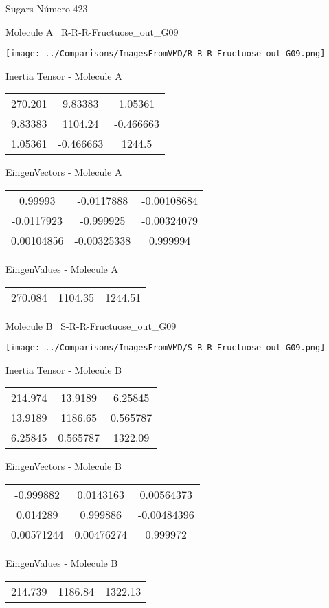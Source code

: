\vtab[-3cm]
\begin{center}
{\large Sugars \tab Número 423}
\end{center}
\begin{multicols}{2}
\begin{center}

Molecule A \
R-R-R-Fructuose\_out\_G09

\texttt{[image: ../Comparisons/ImagesFromVMD/R-R-R-Fructuose\_out\_G09.png]}

Inertia Tensor - Molecule A \\
\begin{tabular}{|c c c|}
270.201	 & 	9.83383	 & 	1.05361	 \\
9.83383	 & 	1104.24	 & 	-0.466663	 \\
1.05361	 & 	-0.466663	 & 	1244.5
\end{tabular}

\vtab
 EingenVectors - Molecule A     \\
\begin{tabular}{|c c c|}
0.99993	 & 	-0.0117888	 & 	-0.00108684	 \\
-0.0117923	 & 	-0.999925	 & 	-0.00324079	 \\
0.00104856	 & 	-0.00325338	 & 	0.999994
\end{tabular}

\vtab
 EingenValues - Molecule A     \\
\begin{tabular}{|c c c|}
270.084	 & 	1104.35	 & 	1244.51	 \\
\end{tabular}
\columnbreak

Molecule B \
S-R-R-Fructuose\_out\_G09

\texttt{[image: ../Comparisons/ImagesFromVMD/S-R-R-Fructuose\_out\_G09.png]}

Inertia Tensor - Molecule B \\
\begin{tabular}{|c c c|}
214.974	 & 	13.9189	 & 	6.25845	 \\
13.9189	 & 	1186.65	 & 	0.565787	 \\
6.25845	 & 	0.565787	 & 	1322.09
\end{tabular}

\vtab
 EingenVectors - Molecule B     \\
\begin{tabular}{|c c c|}
-0.999882	 & 	0.0143163	 & 	0.00564373	 \\
0.014289	 & 	0.999886	 & 	-0.00484396	 \\
0.00571244	 & 	0.00476274	 & 	0.999972
\end{tabular}

\vtab
 EingenValues - Molecule B     \\
\begin{tabular}{|c c c|}
214.739	 & 	1186.84	 & 	1322.13	 \\
\end{tabular}

\end{center}
\end{multicols}

